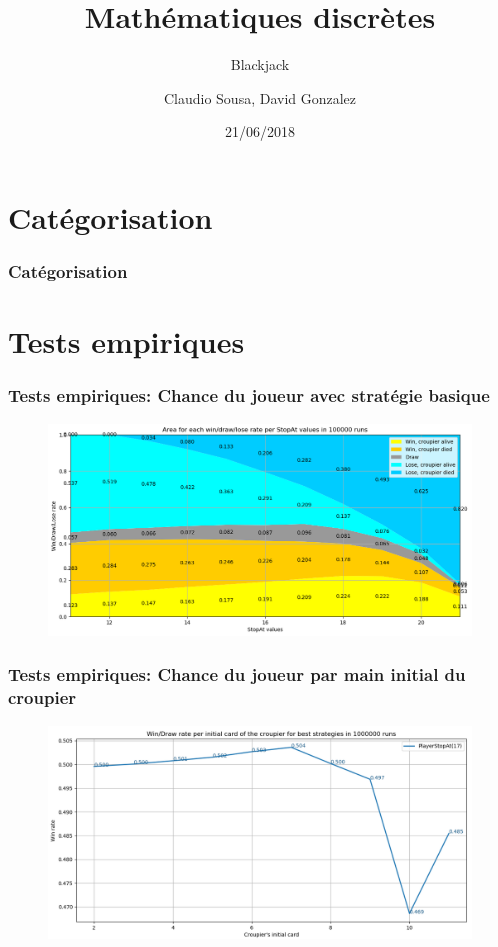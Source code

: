 \documentclass{beamer}
\title[]{Mathématiques discrètes}
\subtitle{Blackjack}
\author{Claudio Sousa, David Gonzalez}
\institute{HEPIA}
\date{21/06/2018}
\begin{document}
\begin{frame}[plain]
    \titlepage
\end{frame}

\section{Catégorisation}

\begin{frame}
    \frametitle{Catégorisation}
\end{frame}

\section{Tests empiriques}

\begin{frame}
    \frametitle{Tests empiriques: Chance du joueur avec stratégie basique}
    \begin{figure}[H]
        \begin{center}
            \includegraphics[width=1\textwidth]{empirical_graph1}
        \end{center}
    \end{figure}
\end{frame}

\begin{frame}
    \frametitle{Tests empiriques: Chance du joueur par main initial du croupier}
    \begin{figure}[H]
        \begin{center}
            \includegraphics[width=1\textwidth]{empirical_graph2}
        \end{center}
    \end{figure}
\end{frame}
\end{document}
